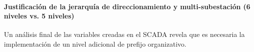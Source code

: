 \begin{table}[tb]
    \centering
    \caption{Desglose jerárquico estricto de los 5 niveles de la norma IEC 61850 en la subestación.}
    \label{tab:arbol_variables_subestacion_corregido}
\end{table}
\FloatBarrier
\paragraph{Justificación de la jerarquía de direccionamiento y multi-subestación (6 niveles vs. 5 niveles)}
\label{sec:sub_jerarquia_6niveles}

Un análisis final de las variables creadas en el \ac{SCADA} revela que es necesaria la implementación de un nivel adicional de prefijo organizativo.\par

